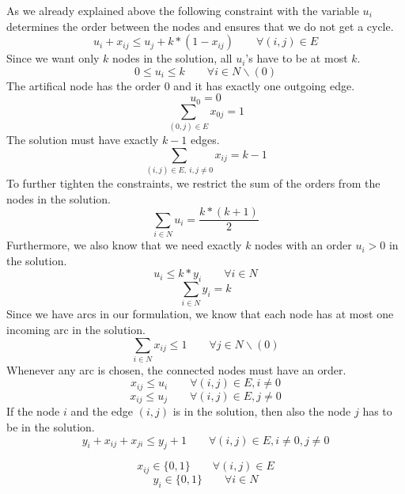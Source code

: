 As we already explained above the following constraint with the variable
$u_i$ determines the order between the nodes and ensures that we do
not get a cycle.
\begin{equation}
  u_{i} + x_{ij} \leq u_{j} + k*(1- x_{ij}) \qquad \forall (i,j) \in E 
\end{equation}
Since we want only $k$ nodes in the solution, all $u_i$'s have to be
at most $k$.
\begin{equation}
  0 \leq u_i \leq k \qquad \forall i \in N \backslash (0) 
\end{equation}
The artifical node has the order $0$ and it has exactly one outgoing edge.
\begin{equation}
  u_0 = 0 
\end{equation}
\begin{equation}
  \sum_{(0,j) \in E} x_{0j} = 1 
\end{equation}
The solution must have exactly $k-1$ edges.
\begin{equation}
  \sum_{(i,j) \in E, \ i,j \not =  0} x_{ij} = k-1 
\end{equation}
To further tighten the constraints, we restrict the sum of the orders
from the nodes in the solution.
\begin{equation}
  \sum_{i \in N} u_i = \frac{k*(k+1)}{2} 
\end{equation}
Furthermore, we also know that we need exactly $k$ nodes with an
order $u_i > 0$ in the solution.
\begin{equation}
  u_i \leq k*y_i \qquad \forall i \in N
\end{equation}
\begin{equation}
  \sum_{i \in N} y_i = k
\end{equation}
Since we have arcs in our formulation, we know that each node 
has at most one incoming arc in the solution. 
\begin{equation}
  \sum_{i \in N} {x_{ij}} \leq 1 \qquad \forall j \in N \backslash (0)
\end{equation}
Whenever any arc is chosen, the connected nodes must have an order.
\begin{equation}
  x_{ij} \leq u_i \qquad \forall (i,j) \in E, i \neq 0
\end{equation}
\begin{equation}
  x_{ij} \leq u_j \qquad \forall (i,j) \in E, j \neq 0
\end{equation}
If the node $i$ and the edge $(i,j)$ is in the solution, then also the node $j$ has to be in the solution.
\begin{equation}
 y_{i} + x_{ij} + x_{ji} \leq y_{j} + 1 \qquad \forall (i,j) \in E, i \neq 0, j \neq 0
 \label{lbl:mtzxy3}
\end{equation}

\begin{equation}
x_{ij} \in \{0,1\} \qquad \forall (i,j) \in E
\end{equation}
\begin{equation}
  y_i \in \{0,1\} \qquad \forall i \in N
\end{equation}
